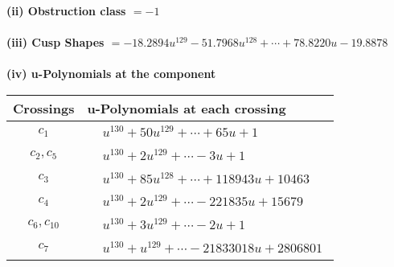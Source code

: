\documentclass[1p]{elsarticle_modified}
\theoremstyle{definition}
\begin{document}
\flushleft \textbf{(ii) Obstruction class $= -1$}\\~\\
\flushleft \textbf{(iii) Cusp Shapes $= -18.2894 u^{129}-51.7968 u^{128}+\cdots+78.8220 u-19.8878$}\\~\\
\newpage\renewcommand{\arraystretch}{1}
\flushleft \textbf{(iv) u-Polynomials at the component}\newline \\
\begin{tabular}{m{50pt}|m{274pt}}
Crossings & \hspace{64pt}u-Polynomials at each crossing \\
\hline $$\begin{aligned}c_{1}\end{aligned}$$&$\begin{aligned}
&u^{130}+50 u^{129}+\cdots+65 u+1
\end{aligned}$\\
\hline $$\begin{aligned}c_{2},c_{5}\end{aligned}$$&$\begin{aligned}
&u^{130}+2 u^{129}+\cdots-3 u+1
\end{aligned}$\\
\hline $$\begin{aligned}c_{3}\end{aligned}$$&$\begin{aligned}
&u^{130}+85 u^{128}+\cdots+118943 u+10463
\end{aligned}$\\
\hline $$\begin{aligned}c_{4}\end{aligned}$$&$\begin{aligned}
&u^{130}+2 u^{129}+\cdots-221835 u+15679
\end{aligned}$\\
\hline $$\begin{aligned}c_{6},c_{10}\end{aligned}$$&$\begin{aligned}
&u^{130}+3 u^{129}+\cdots-2 u+1
\end{aligned}$\\
\hline $$\begin{aligned}c_{7}\end{aligned}$$&$\begin{aligned}
&u^{130}+u^{129}+\cdots-21833018 u+2806801
\end{aligned}$\\

\end{tabular}
\end{document}
